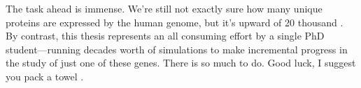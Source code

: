 The task ahead is immense. We're still not exactly sure how many unique proteins are expressed by the human genome, but it's upward of 20 thousand \cite{salzberg2018}. By contrast, this thesis represents an all consuming effort by a single PhD student---running decades worth of simulations to make incremental progress in the study of just one of these genes. There is so much to do. Good luck, I suggest you pack a towel \cite{adams1979}. 
